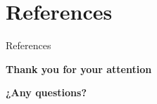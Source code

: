 \documentclass[dvipsnames, aspectratio = 169]{beamer}
\begin{document}
\section{References}

\begin{frame}{References}
	\nocite{*}
	
\end{frame}

\begin{frame}
	\begin{center}
		\LARGE \textbf{Thank you for your attention}
	\end{center}
	\begin{center}
		\vskip 20pt
		\LARGE \textbf{¿Any questions?}
	\end{center}
\end{frame}
\end{document}
